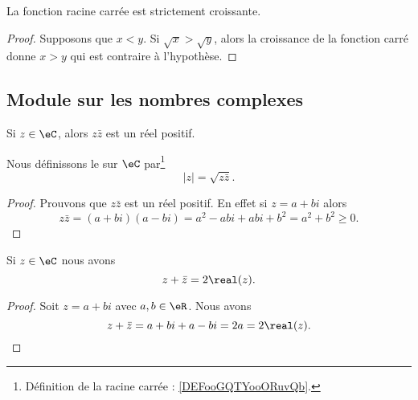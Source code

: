 \begin{lemma}       \label{LEMooSBOAooOOIotR}
	La fonction racine carrée est strictement croissante.
\end{lemma}

\begin{proof}
	Supposons que \( x<y\). Si \( \sqrt{ x }>\sqrt{ y }\), alors la croissance de la fonction carré donne \( x>y\) qui est contraire à l'hypothèse.
\end{proof}

\subsection{Module sur les nombres complexes}

\begin{lemmaDef}        \label{LEMooVHDAooJyoakR}
	Si \( z\in \eC\), alors \( z\bar z\) est un réel positif.

	Nous définissons le  sur \( \eC\) par\footnote{Définition de la racine carrée : \ref{DEFooGQTYooORuvQb}.}
	\begin{equation}
		| z |=\sqrt{ z\bar z }.
	\end{equation}
\end{lemmaDef}

\begin{proof}
	Prouvons que \( z\bar z\) est un réel positif. En effet si \( z=a+bi\) alors
	\begin{equation}
		z\bar z=(a+bi)(a-bi)=a^2-abi+abi+b^2=a^2+b^2\geq 0.
	\end{equation}
\end{proof}

\begin{lemma}       \label{LEMooJRLWooScVrkG}
	Si \( z\in \eC\) nous avons
	\begin{equation}        \label{EQooQDGTooBejPUE}
		z+\bar z=2\real(z).
	\end{equation}
\end{lemma}

\begin{proof}
	Soit \( z=a+bi\) avec \( a,b\in \eR\). Nous avons
	\begin{equation}
		z+\bar z=a+bi+a-bi=2a=2\real(z).
	\end{equation}
\end{proof}

